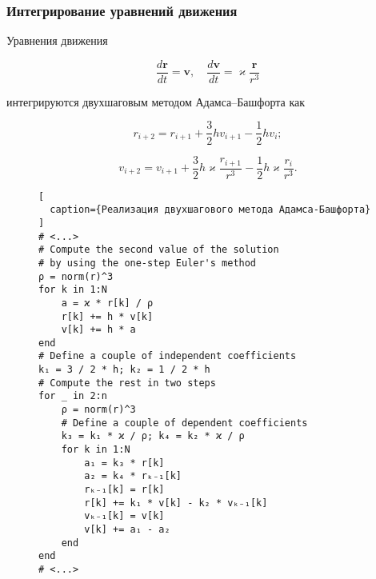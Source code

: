 \begin{frame}
\frametitle{Интегрирование уравнений движения}

Уравнения движения

\su
\begin{equation}
  \frac{d\mathbf{r}}{dt} = \mathbf{v}, \quad \frac{d \mathbf{v}}{dt} = \varkappa \frac{\mathbf{r}}{r^3}
\end{equation}

интегрируются двухшаговым методом Адамса--Башфорта как

\su
\begin{equation}
  r_{i+2} = r_{i+1} + \frac{3}{2} h v_{i+1} - \frac{1}{2} h v_i;
\end{equation}

\su
\begin{equation}
  v_{i+2} = v_{i+1} + \frac{3}{2} h \varkappa \frac{r_{i+1}}{r^3} - \frac{1}{2} h \varkappa \frac{r_i}{r^3}.
\end{equation}

\end{frame}

\captionsetup{singlelinecheck=false, justification=justified}

\begin{frame}[fragile]

\begin{figure}[h!]
\begin{lstlisting}[
  caption={Реализация двухшагового метода Адамса-Башфорта}
]
# <...>
# Compute the second value of the solution
# by using the one-step Euler's method
ρ = norm(r)^3
for k in 1:N
    a = ϰ * r[k] / ρ
    r[k] += h * v[k]
    v[k] += h * a
end
# Define a couple of independent coefficients
k₁ = 3 / 2 * h; k₂ = 1 / 2 * h
# Compute the rest in two steps
for _ in 2:n
    ρ = norm(r)^3
    # Define a couple of dependent coefficients
    k₃ = k₁ * ϰ / ρ; k₄ = k₂ * ϰ / ρ
    for k in 1:N
        a₁ = k₃ * r[k]
        a₂ = k₄ * rₖ₋₁[k]
        rₖ₋₁[k] = r[k]
        r[k] += k₁ * v[k] - k₂ * vₖ₋₁[k]
        vₖ₋₁[k] = v[k]
        v[k] += a₁ - a₂
    end
end
# <...>
\end{lstlisting}
\end{figure}

\end{frame}

\captionsetup{justification=centering}

